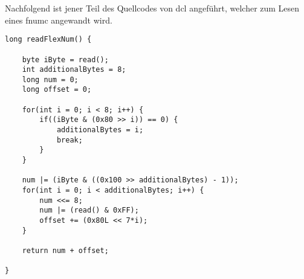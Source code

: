 Nachfolgend ist jener Teil des Quellcodes von \gls{dcl} angeführt, welcher zum Lesen eines
\gls{fnumc} angewandt wird.\\

\javalisting
\begin{minipage}{\linewidth}
\begin{lstlisting}[caption={Lesen eines \gls*{fnumc} (Java)},captionpos=b]
long readFlexNum() {
	
	byte iByte = read();
	int additionalBytes = 8;
	long num = 0;
	long offset = 0;
	
	for(int i = 0; i < 8; i++) {
		if((iByte & (0x80 >> i)) == 0) {
			additionalBytes = i;
			break;
		}
	}
	
	num |= (iByte & ((0x100 >> additionalBytes) - 1));
	for(int i = 0; i < additionalBytes; i++) {
		num <<= 8;
		num |= (read() & 0xFF);
		offset += (0x80L << 7*i);
	}
	
	return num + offset;
	
}
\end{lstlisting}
\end{minipage}



